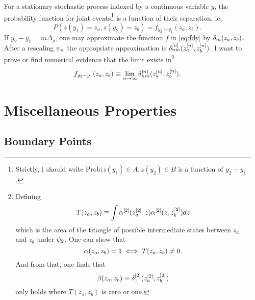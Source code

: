 \documentclass[twocolumn]{article}
\begin{document}
For a stationary stochastic process indexed by a continuous variable
$y$, the probability function for joint events\footnote{Strictly, I
  should write $\text{Prob}(z(y_1)\in A, z(y_2) \in B$ is a function
  of $y_2-y_1$.} is a function of their separation, ie,
\begin{equation}
  \label{eq:fdy}
  P(z(y_1)=z_a, z(y_2)=z_b) = f_{y_2-y_1}(z_a,z_b).
\end{equation}
If $y_2-y_1 = m\Delta_y$, one may approximate the function $f$ in
\eqref{eq:fdy} by $\delta_{m}(z_a,z_b)$.  After a rescaling $\psi_{n}$
the appropriate approximation is $\delta_{nm}^{[n]}(z_a^{[n]},z_b^{[n]})$.
I want to prove or find numerical evidence that the limit exists
in\footnote{Defining
  \begin{equation*}
    T(z_a,z_b) \equiv \int \alpha^{[2]}(z_a^{[2]}, z)
    \alpha^{[2]} (z, z_b^{[2]}) dz
  \end{equation*}
  which is the area of the triangle of possible intermediate states
  between $z_a$ and $z_b$ under $\psi_{2}$.  One can show that
  \begin{equation*}
    \alpha(z_a,z_b) = 1 \iff T(z_a,z_b) \neq 0.
  \end{equation*}
  And from that, one finds that
  \begin{equation*}
  \beta(z_a,z_b) = \delta_{1}^{[2]}(z_a^{[2]},z_b^{[2]})
  \end{equation*}
  only holds where $T(z_a,z_b)$ is zero or one.}
\begin{equation}
  \label{eq:flim}
  f_{y_2-y_1}(z_a,z_b) \equiv \lim_{n\rightarrow \infty}
  \delta_{nm}^{[n]}(z_a^{[n]},z_b^{[n]}).
\end{equation}

\section{Miscellaneous Properties}
\label{sec:properties}

\subsection{Boundary Points}
\label{sec:boundary}
\end{document}
